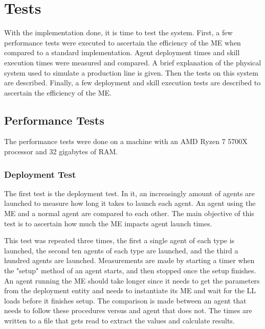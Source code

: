 


\chapter{Tests}
\label{cha:tests}

With the implementation done, it is time to test the system. First, a few performance tests were executed to ascertain the efficiency of the \acrlong{ME} when compared to a standard implementation. Agent deployment times and skill execution times were measured and compared. A brief explanation of the physical system used to simulate a production line is given. Then the tests on this system are described. Finally, a few deployment and skill execution tests are described to ascertain the efficiency of the \acrshort{ME}.

\section{Performance Tests}
\label{sec:performance_tests}

The performance tests were done on a machine with an AMD Ryzen 7 5700X processor and 32 gigabytes of RAM.

\subsection{Deployment Test}

The first test is the deployment test. In it, an increasingly amount of agents are launched to measure how long it takes to launch each agent. An agent using the \acrlong{ME} and a normal agent are compared to each other. The main objective of this test is to ascertain how much the \acrshort{ME} impacts agent launch times.

This test was repeated three times, the first a single agent of each type is launched, the second ten agents of each type are launched, and the third a hundred agents are launched. Measurements are made by starting a timer when the "setup" method of an agent starts, and then stopped once the setup finishes. An agent running the \acrlong{ME} should take longer since it needs to get the parameters from the deployment entity and needs to instantiate its \acrshort{ME} and wait for the \acrshort{LL} loads before it finishes setup. The comparison is made between an agent that needs to follow these procedures versus and agent that does not. The times are written to a file that gets read to extract the values and calculate results.

